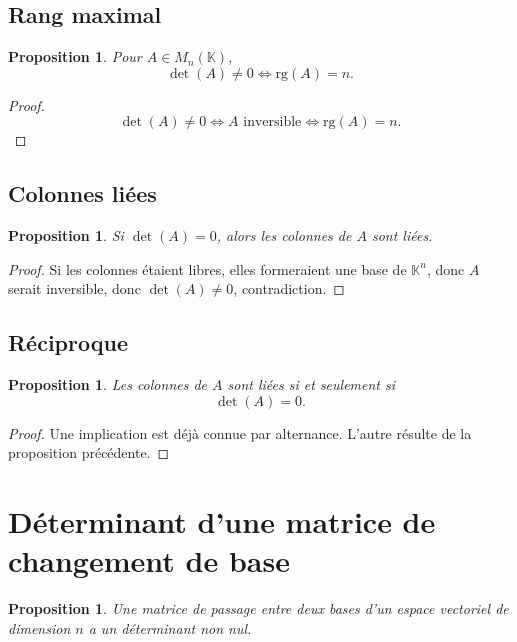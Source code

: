 \documentclass[11pt,a4paper]{article}
\newtheorem{proposition}[definition]{Proposition}
\theoremstyle{remark}
\newcommand{\K}{\mathbb{K}}
\newcommand{\rg}{\mathrm{rg}}
\begin{document}
\subsection{Rang maximal}

\begin{proposition}
Pour \(A\in M_n(\K)\),
\[
\det(A)\neq 0 \Longleftrightarrow \rg(A)=n.
\]
\end{proposition}

\begin{proof}
\[
\det(A)\neq 0
\Longleftrightarrow
A \text{ inversible}
\Longleftrightarrow
\rg(A)=n.
\]
\end{proof}

\subsection{Colonnes liées}

\begin{proposition}
Si \(\det(A)=0\), alors les colonnes de \(A\) sont liées.
\end{proposition}

\begin{proof}
Si les colonnes étaient libres, elles formeraient une base de \(\K^n\), donc \(A\) serait inversible, donc \(\det(A)\neq 0\), contradiction.
\end{proof}

\subsection{Réciproque}

\begin{proposition}
Les colonnes de \(A\) sont liées si et seulement si
\[
\det(A)=0.
\]
\end{proposition}

\begin{proof}
Une implication est déjà connue par alternance. L’autre résulte de la proposition précédente.
\end{proof}

\section{Déterminant d’une matrice de changement de base}

\begin{proposition}
Une matrice de passage entre deux bases d’un espace vectoriel de dimension \(n\) a un déterminant non nul.
\end{proposition}
\end{document}
